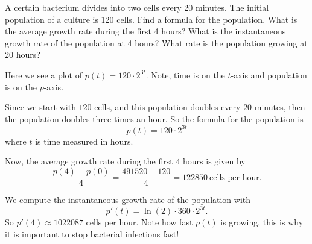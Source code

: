\begin{example}
A certain bacterium divides into two cells every 20 minutes. The
initial population of a culture is 120 cells. Find a formula for the
population.  What is the average growth rate during the first 4 hours?
What is the instantaneous growth rate of the population at 4 hours?
What rate is the population growing at 20 hours?
\end{example}
\begin{marginfigure}
\caption{Here we see a plot of $p(t) = 120\cdot 2^{3t}$. Note, time is on
  the $t$-axis and population is on the $p$-axis.}
\end{marginfigure}


\begin{solution}
Since we start with $120$ cells, and this population doubles every $20$
minutes, then the population doubles three times an hour. So the
formula for the population is
\[
p(t) = 120\cdot 2^{3t}
\]
where $t$ is time measured in hours.

Now, the average growth rate during the first $4$ hours is given by
\[
\frac{p(4)-p(0)}{4} =\frac{491520-120}{4} = 122850~\text{cells per hour.}
\]

We compute the instantaneous growth rate of the population with
\[
p'(t) = \ln(2)\cdot 360\cdot 2^{3t}.
\]
So $p'(4) \approx 1022087$ cells per hour. Note how fast $p(t)$ is
growing, this is why it is important to stop bacterial infections
fast!
\end{solution}



